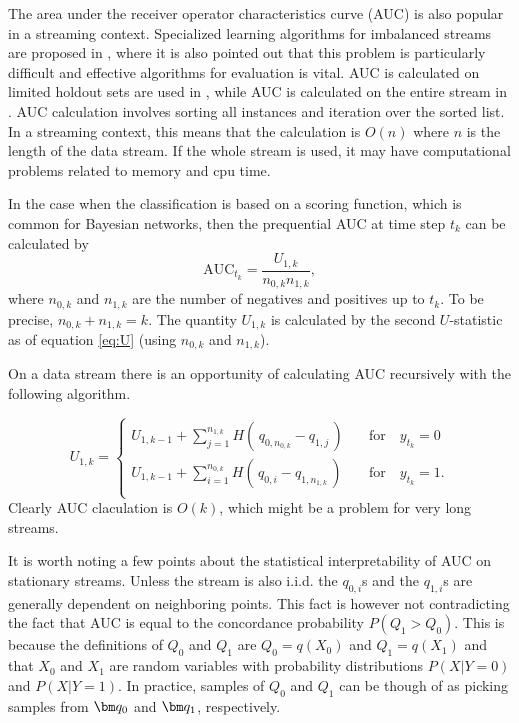 

The area under the receiver operator characteristics curve (AUC) is also popular in a streaming context. 
Specialized learning algorithms for imbalanced streams are proposed in \cite{Dit13, Hoe12, Lic10}, where it is also pointed out that this problem is particularly difficult and effective algorithms for evaluation is vital.  
AUC is calculated on limited holdout sets are used in  \cite{Dit13, Lic10}, while AUC is calculated on the entire stream in  \cite{Hoe12}.
AUC calculation involves sorting all instances and iteration over the sorted list.  In a streaming context, this means that the calculation is $O(n)$ where $n$ is the length of the data stream.  If the whole stream is used, it may have computational problems related to memory and cpu time.  

In the case when the classification is based on a scoring function, which is common for Bayesian networks, then the prequential AUC at time step $t_k$ can be calculated by
\begin{equation}
\label{eq:prequentialAUC}
\mbox{AUC}_{t_k}= \frac{U_{1,k}}{n_{0,k}n_{1,k}},
\end{equation}
where $n_{0,k}$ and $n_{1,k}$ are the number of negatives and positives up to $t_k$.  To be precise, $n_{0,k} + n_{1,k} = k$.  The quantity $U_{1,k}$ is calculated by the second $U$-statistic as of equation \eqref{eq:U} (using $n_{0,k}$ and $n_{1,k}$).

On a data stream there is an opportunity of calculating AUC recursively with the following algorithm.

\begin{equation}
\label{eq:prequentialAUC2}
U_{1,k}= 
\begin{cases}
U_{1,k-1} + \sum_{j=1}^{n_{1,k}} H( \,q_{0,n_{0,k}} - q_{1,j}    \,)
 \quad &\mbox{for} \quad y_{t_k} = 0\\
U_{1,k-1} + \sum_{i=1}^{n_{0,k}} H( \,q_{0,i} - q_{1,n_{1,k}}    \,)
\quad &\mbox{for} \quad y_{t_k} = 1.\\
\end{cases}
\end{equation}
Clearly AUC claculation is $O(k)$, which might be a problem for very long streams.  

It is worth noting a few points about the statistical interpretability of AUC on stationary streams.  Unless the stream is also i.i.d. the $q_{0,i}$s and the $q_{1,i}$s are generally dependent on neighboring points.  This fact is however not contradicting the fact that AUC is equal to the concordance probability $ P(Q_1 > Q_0)$.  This is because the definitions of $Q_0$ and $Q_1$ are $Q_0 = q(X_0)$ and $Q_1 = q(X_1)$ and 
that $X_0$ and $X_1$ are random variables with probability distributions $P(X | Y = 0)$ and $P(X | Y = 1)$.  In practice, samples of $Q_0$ and $Q_1$ can be though of as picking samples from $\bv{q_0}$ and $\bv{q_1}$, respectively.

